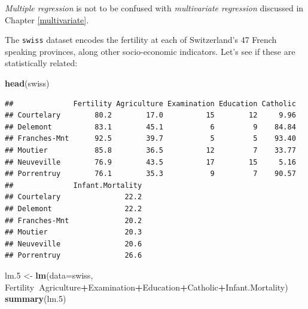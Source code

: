 \documentclass[]{book}
\newenvironment{Shaded}{\begin{snugshade}}{\end{snugshade}}
\newcommand{\DataTypeTok}[1]{\textcolor[rgb]{0.13,0.29,0.53}{#1}}
\newcommand{\FloatTok}[1]{\textcolor[rgb]{0.00,0.00,0.81}{#1}}
\newcommand{\KeywordTok}[1]{\textcolor[rgb]{0.13,0.29,0.53}{\textbf{#1}}}
\newcommand{\NormalTok}[1]{#1}
\newcommand{\OperatorTok}[1]{\textcolor[rgb]{0.81,0.36,0.00}{\textbf{#1}}}
\newcommand{\StringTok}[1]{\textcolor[rgb]{0.31,0.60,0.02}{#1}}
\theoremstyle{definition}
\theoremstyle{definition}
\theoremstyle{definition}
\theoremstyle{remark}
\let\BeginKnitrBlock\begin \let\EndKnitrBlock\end
\begin{document}
\BeginKnitrBlock{remark}
{}\emph{Multiple regression} is not to be confused with \emph{multivariate regression} discussed in Chapter \ref{multivariate}.
\EndKnitrBlock{remark}

The \texttt{swiss} dataset encodes the fertility at each of Switzerland's 47 French speaking provinces, along other socio-economic indicators. Let's see if these are statistically related:

\begin{Shaded}
\begin{Highlighting}[]
\KeywordTok{head}\NormalTok{(swiss)}
\end{Highlighting}
\end{Shaded}

\begin{verbatim}
##              Fertility Agriculture Examination Education Catholic
## Courtelary        80.2        17.0          15        12     9.96
## Delemont          83.1        45.1           6         9    84.84
## Franches-Mnt      92.5        39.7           5         5    93.40
## Moutier           85.8        36.5          12         7    33.77
## Neuveville        76.9        43.5          17        15     5.16
## Porrentruy        76.1        35.3           9         7    90.57
##              Infant.Mortality
## Courtelary               22.2
## Delemont                 22.2
## Franches-Mnt             20.2
## Moutier                  20.3
## Neuveville               20.6
## Porrentruy               26.6
\end{verbatim}

\begin{Shaded}
\begin{Highlighting}[]
\NormalTok{lm}\FloatTok{.5}\NormalTok{ <-}\StringTok{ }\KeywordTok{lm}\NormalTok{(}\DataTypeTok{data=}\NormalTok{swiss, Fertility}\OperatorTok{~}\NormalTok{Agriculture}\OperatorTok{+}\NormalTok{Examination}\OperatorTok{+}\NormalTok{Education}\OperatorTok{+}\NormalTok{Catholic}\OperatorTok{+}\NormalTok{Infant.Mortality)}
\KeywordTok{summary}\NormalTok{(lm}\FloatTok{.5}\NormalTok{)}
\end{Highlighting}
\end{Shaded}
\end{document}
